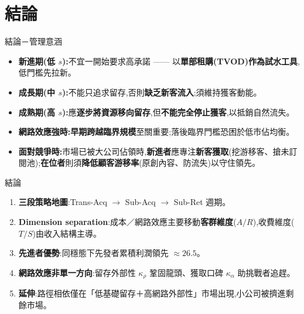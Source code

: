 \documentclass[aspectratio=169,11pt,fontset=none]{ctexbeamer}
\begin{document}
\section{結論}
\begin{frame}{結論－管理意涵}
  \footnotesize
  \begin{itemize}\itemsep4pt
    \item \textcolor{ottred}{\textbf{新進期(低 $s$):}}不宜一開始要求高承諾 —— 以\textbf{單部租購(TVOD)作為試水工具},低門檻先拉新。
    \item \textcolor{ottteal}{\textbf{成長期(中 $s$):}}不能只追求留存,否則\textbf{缺乏新客流入};須維持獲客動能。
    \item \textcolor{ottdark}{\textbf{成熟期(高 $s$):}}應\textbf{逐步將資源移向留存},但\textbf{不能完全停止獲客},以抵銷自然流失。
    \item \textcolor{rblue}{\textbf{網路效應強時:}}\textbf{早期跨越臨界規模}至關重要;落後臨界門檻恐困於低市佔均衡。
      \item \textcolor{ottorange}{\textbf{面對競爭時:}}市場已被大公司佔領時,\textbf{新進者}應專注\textbf{新客獲取}(挖游移客、搶未訂閱池);\textbf{在位者}則須\textbf{降低顧客游移率}(原創內容、防流失)以守住領先。
  \end{itemize}
\end{frame}

\begin{frame}{結論}
  \footnotesize
  \begin{enumerate}\itemsep2pt
    \item \textbf{三段策略地圖}:Trans-Acq $\to$ Sub-Acq $\to$ Sub-Ret 週期。
    \item \textbf{Dimension separation}:成本／網路效應主要移動\textbf{客群維度}($A/R$),收費維度($T/S$)由收入結構主導。
    \item \textbf{先進者優勢}:同穩態下先發者累積利潤領先 ${\approx}26.5$。
    \item \textbf{網路效應非單一方向}:留存外部性 $\kappa_\rho$ 鞏固龍頭、獲取口碑 $\kappa_\alpha$ 助挑戰者追趕。
    \item \textbf{延伸}:路徑相依僅在「低基礎留存＋高網路外部性」市場出現,小公司被擠進剩餘市場。
  \end{enumerate}
\end{frame}
\end{document}
